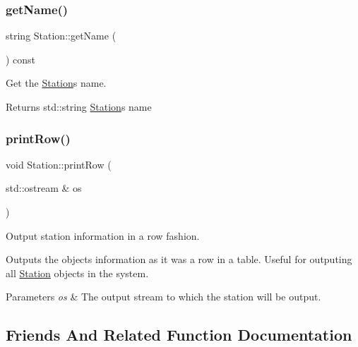 \subsubsection{\texorpdfstring{get\+Name()}{getName()}}
{\footnotesize\ttfamily string Station\+::get\+Name (\begin{DoxyParamCaption}{ }\end{DoxyParamCaption}) const}



Get the \mbox{\hyperlink{classStation}{Station}}\textquotesingle{}s name. 

\begin{DoxyReturn}{Returns}
std\+::string \mbox{\hyperlink{classStation}{Station}}\textquotesingle{}s name 
\end{DoxyReturn}
\mbox{\label{classStation_a66c028cdffd79bddd0704235b051ff4e}} 
\subsubsection{\texorpdfstring{print\+Row()}{printRow()}}
{\footnotesize\ttfamily void Station\+::print\+Row (\begin{DoxyParamCaption}\item[{std\+::ostream \&}]{os }\end{DoxyParamCaption})}



Output station information in a row fashion. 

Outputs the object\textquotesingle{}s information as it was a row in a table. Useful for outputing all \mbox{\hyperlink{classStation}{Station}} objects in the system.


\begin{DoxyParams}{Parameters}
{\em os} & The output stream to which the station will be output. \\
\hline
\end{DoxyParams}


\subsection{Friends And Related Function Documentation}
\mbox{\label{classStation_ae5ca3266f8eead5634eb5926438392da}} 
